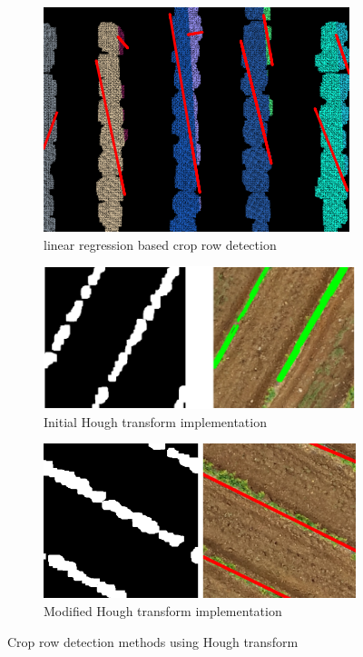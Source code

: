 \documentclass[conference]{IEEEtran}
\begin{document}
		\begin{figure}[t]
		\centering
			\begin{subfigure}{\linewidth}
			\centering
			\includegraphics[width=0.5\linewidth]{Kmeans_Row_Result.png}
			\caption{linear regression based crop row detection}
			\label{fig_Linear_Regression}
		\end{subfigure}
		
		\vspace{0.5cm}
		
		\begin{subfigure}{\linewidth}
			\centering
			\includegraphics[width=0.7\linewidth]{Hough initial2.png}
			\caption{Initial Hough transform implementation}
			\label{fig_Hough_Init}
		\end{subfigure}
		
		\vspace{0.5cm} %
		
		\begin{subfigure}{\linewidth}
			\centering
			\includegraphics[width=0.7\linewidth]{Hough Revised2.png}
			\caption{Modified Hough transform implementation}
			\label{fig_Hough_mod}
		\end{subfigure}
		
		\caption{Crop row detection methods using Hough transform \cite{b5}}
		\label{fig:comparison}
	\end{figure}
	
\end{document}
